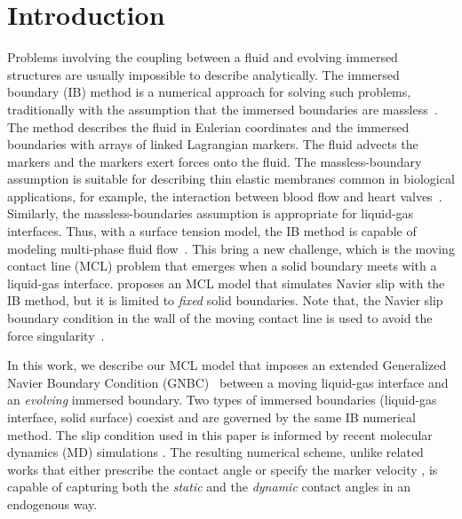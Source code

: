 \documentclass{jfm}
\begin{document}
\section{Introduction}
Problems involving the coupling between a fluid and evolving immersed structures are usually impossible to describe analytically. The immersed boundary (IB) method is a numerical approach for solving such problems, traditionally with the assumption that the immersed boundaries are massless~\citep{peskin1972flow}. The method describes the fluid in Eulerian coordinates and the immersed boundaries with arrays of linked Lagrangian markers. The fluid advects the markers and the markers exert forces onto the fluid. The massless-boundary assumption is suitable for describing thin elastic membranes common in biological applications, for example, the interaction between blood flow and heart valves~\citep{peskin1972flow}. Similarly, the massless-boundaries assumption is appropriate for liquid-gas interfaces. Thus, with a surface tension model, the IB method is capable of modeling multi-phase fluid flow~\citep{leveque1997immersed, lorstad2004assessment, popinet2018numerical,  huang2018improved}. This bring a new challenge, which is the moving contact line (MCL) problem that emerges when a solid boundary meets with a liquid-gas interface. \citet{lai2010numerical} proposes an MCL model that simulates Navier slip with the IB method, but it is limited to \textit{fixed} solid boundaries. Note that, the Navier slip boundary condition in the wall of the moving contact line is used to avoid the force singularity~\citep{lai2010numerical}. 


In this work, we describe our MCL model that imposes an extended Generalized Navier Boundary Condition (GNBC)~\citep{quian2003generalized} between a moving liquid-gas interface and an \textit{evolving} immersed boundary. Two types of immersed boundaries (liquid-gas interface, solid surface) coexist and are governed by the same IB numerical method. The slip condition used in this paper is informed by recent molecular dynamics (MD) simulations \citep{johansson2018molecular}. The resulting numerical scheme, unlike related works that either prescribe the contact angle \citep{muradoglu2010front,liu2015diffuse} or specify the marker velocity \citep{manservisi2009variational}, is capable of capturing both the \textit{static} and the \textit{dynamic} contact angles in an endogenous way. 
\end{document}
